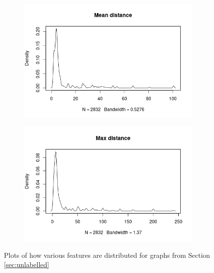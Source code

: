 \documentclass{l4proj}
\theoremstyle{definition}
\theoremstyle{remark}
\begin{document}
\begin{figure}
\begin{subfigure}[t]{0.49\textwidth}
  \end{subfigure}
  \begin{subfigure}[t]{0.49\textwidth}
    \centering
    \includegraphics[width=\textwidth]{images/sip_meandist.png}
  \end{subfigure}
  \begin{subfigure}[t]{0.49\textwidth}
    \centering
    \includegraphics[width=\textwidth]{images/sip_maxdist.png}
  \end{subfigure}
  \caption{Plots of how various features are distributed for graphs from Section
  \ref{sec:unlabelled}}
  \label{fig:sip_features1}
\end{figure}
\end{document}
